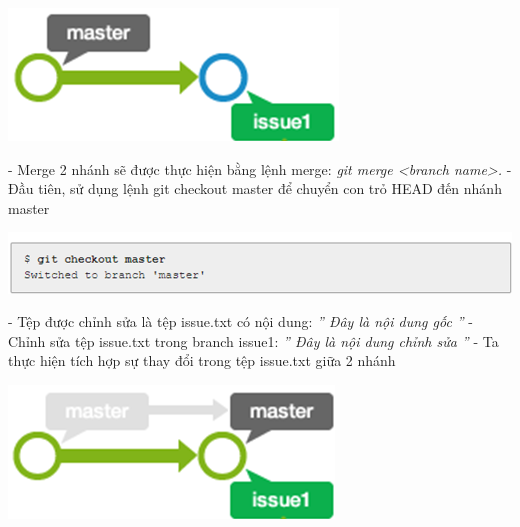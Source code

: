 \documentclass[12pt,a4paper]{report}
\begin{document}
	\includegraphics[width=0.8\linewidth]{screenshot060}

	\label{fig:screenshot060}	\vskip 0.4cm	\vskip 0.4cm

- Merge 2 nhánh sẽ được thực hiện bằng lệnh merge: {\it git merge <branch name>.}	\vskip 0.4cm 
- Đầu tiên, sử dụng lệnh git checkout master để chuyển con trỏ HEAD đến nhánh master	\vskip 0.4cm

	\includegraphics[width=0.8\linewidth]{screenshot061}

	\label{fig:screenshot061}
	\vskip 0.4cm	\vskip 0.4cm
- Tệp được chỉnh sửa là tệp issue.txt có nội dung: {\it ''  Đây là nội dung gốc ''}	\vskip 0.4cm
- Chỉnh sửa tệp issue.txt trong branch issue1: {\it '' Đây là nội dung chỉnh sửa ''}	\vskip 0.4cm
- Ta thực hiện tích hợp sự thay đổi trong tệp issue.txt giữa 2 nhánh	\vskip 0.4cm

	\includegraphics[width=0.8\linewidth]{screenshot062}
\end{document}
